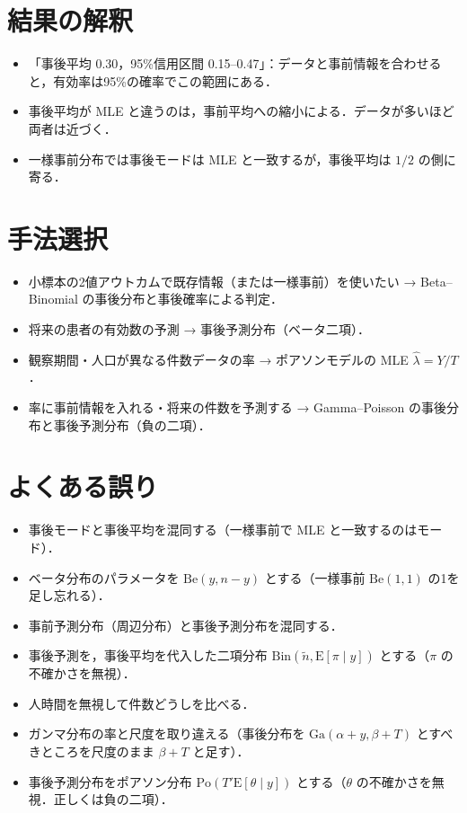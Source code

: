 \documentclass[a4paper,11pt,openany]{ltjsbook}
\newcommand{\E}{\mathrm{E}}
\newcommand{\Bin}{\mathrm{Bin}}
\newcommand{\Po}{\mathrm{Po}}
\newcommand{\Ga}{\mathrm{Ga}}
\newcommand{\Be}{\mathrm{Be}}
\begin{document}
\section{結果の解釈}\label{sec:17-interp}
\begin{itemize}
\item 「事後平均 0.30，95\%信用区間 0.15--0.47」：データと事前情報を合わせると，有効率は95\%の確率でこの範囲にある．
\item 事後平均が MLE と違うのは，事前平均への縮小による．データが多いほど両者は近づく．
\item 一様事前分布では事後モードは MLE と一致するが，事後平均は $1/2$ の側に寄る．
\end{itemize}

\section{手法選択}\label{sec:17-choice}
\begin{itemize}
\item 小標本の2値アウトカムで既存情報（または一様事前）を使いたい → Beta--Binomial の事後分布と事後確率による判定．
\item 将来の患者の有効数の予測 → 事後予測分布（ベータ二項）．
\item 観察期間・人口が異なる件数データの率 → ポアソンモデルの MLE $\hat\lambda=Y/T$．
\item 率に事前情報を入れる・将来の件数を予測する → Gamma--Poisson の事後分布と事後予測分布（負の二項）．
\end{itemize}

\section{よくある誤り}\label{sec:17-err}
\begin{warnbox}
\begin{itemize}
\item 事後モードと事後平均を混同する（一様事前で MLE と一致するのはモード）．
\item ベータ分布のパラメータを $\Be(y,n-y)$ とする（一様事前 $\Be(1,1)$ の1を足し忘れる）．
\item 事前予測分布（周辺分布）と事後予測分布を混同する．
\item 事後予測を，事後平均を代入した二項分布 $\Bin(\tilde n,\E[\pi\mid y])$ とする（$\pi$ の不確かさを無視）．
\item 人時間を無視して件数どうしを比べる．
\item ガンマ分布の率と尺度を取り違える（事後分布を $\Ga(\alpha+y,\beta+T)$ とすべきところを尺度のまま $\beta+T$ と足す）．
\item 事後予測分布をポアソン分布 $\Po(T'\E[\theta\mid y])$ とする（$\theta$ の不確かさを無視．正しくは負の二項）．
\end{itemize}
\end{warnbox}
\end{document}

